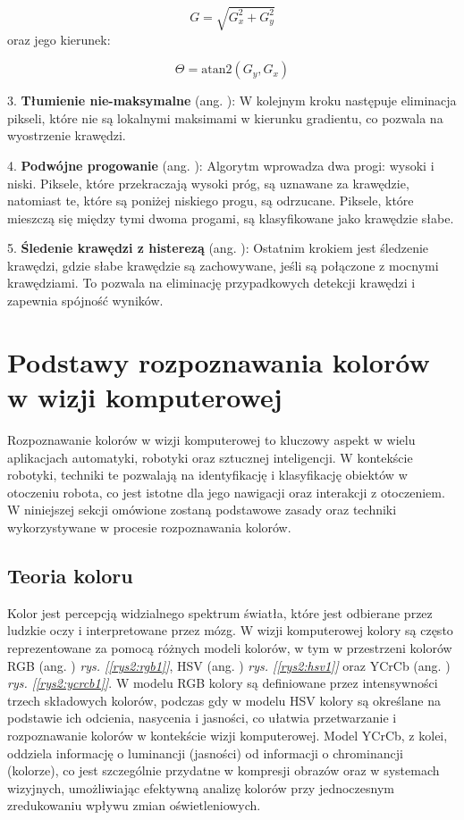 \[
G = \sqrt{G_x^2 + G_y^2}
\]
oraz jego kierunek:

\[
\Theta = \text{atan2}(G_y, G_x)
\]

3. \textbf{Tłumienie nie-maksymalne} (ang. ): W kolejnym kroku następuje eliminacja pikseli, które nie są lokalnymi maksimami w kierunku gradientu, co pozwala na wyostrzenie krawędzi.

4. \textbf{Podwójne progowanie} (ang. ): Algorytm wprowadza dwa progi: wysoki i niski. Piksele, które przekraczają wysoki próg, są uznawane za krawędzie, natomiast te, które są poniżej niskiego progu, są odrzucane. Piksele, które mieszczą się między tymi dwoma progami, są klasyfikowane jako krawędzie słabe.

5. \textbf{Śledenie krawędzi z histerezą} (ang. ): Ostatnim krokiem jest śledzenie krawędzi, gdzie słabe krawędzie są zachowywane, jeśli są połączone z mocnymi krawędziami. To pozwala na eliminację przypadkowych detekcji krawędzi i zapewnia spójność wyników.


\section{Podstawy rozpoznawania kolorów w wizji komputerowej}

Rozpoznawanie kolorów w wizji komputerowej to kluczowy aspekt w wielu aplikacjach automatyki, robotyki oraz sztucznej inteligencji. W kontekście robotyki, techniki te pozwalają na identyfikację i klasyfikację obiektów w otoczeniu robota, co jest istotne dla jego nawigacji oraz interakcji z otoczeniem. W niniejszej sekcji omówione zostaną podstawowe zasady oraz techniki wykorzystywane w procesie rozpoznawania kolorów.

\subsection{Teoria koloru}


Kolor jest percepcją widzialnego spektrum światła, które jest odbierane przez ludzkie oczy i interpretowane przez mózg. W wizji komputerowej kolory są często reprezentowane za pomocą różnych modeli kolorów, w tym w przestrzeni kolorów RGB (ang. ) \textit{rys. [\ref{rys2:rgb1}]}, HSV (ang. ) \textit{rys. [\ref{rys2:hsv1}]} oraz YCrCb (ang. ) \textit{rys. [\ref{rys2:ycrcb1}]}. W modelu RGB kolory są definiowane przez intensywności trzech składowych kolorów, podczas gdy w modelu HSV kolory są określane na podstawie ich odcienia, nasycenia i jasności, co ułatwia przetwarzanie i rozpoznawanie kolorów w kontekście wizji komputerowej. Model YCrCb, z kolei, oddziela informację o luminancji (jasności) od informacji o chrominancji (kolorze), co jest szczególnie przydatne w kompresji obrazów oraz w systemach wizyjnych, umożliwiając efektywną analizę kolorów przy jednoczesnym zredukowaniu wpływu zmian oświetleniowych.


